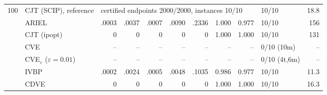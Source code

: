 \begin{table}[htbp]
\begin{tabular}{rlrrrrrrrlr}
\midrule
100 & CJT (SCIP), reference & \multicolumn{7}{l}{certified endpoints 2000/2000, instances 10/10} & 10/10 & 18.8 \\
 & ARIEL & .0003 & .0037 & .0007 & .0090 & .2336 & 1.000 & 0.977 & 10/10 & 156 \\
 & CJT (ipopt) & 0 & 0 & 0 & 0 & 0 & 1.000 & 1.000 & 10/10 & 131 \\
 & CVE & -- & -- & -- & -- & -- & -- & -- & 0/10 (10m) & -- \\
 & CVE$_\varepsilon$ ($\varepsilon{=}0.01$) & -- & -- & -- & -- & -- & -- & -- & 0/10 (4t,6m) & -- \\
 & IVBP & .0002 & .0024 & .0005 & .0048 & .1035 & 0.986 & 0.977 & 10/10 & 11.3 \\
 & CDVE & 0 & 0 & 0 & 0 & 0 & 1.000 & 1.000 & 10/10 & 16.3 \\
\bottomrule
\end{tabular}
\end{table}

